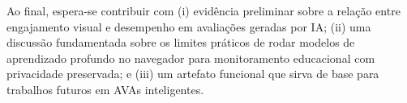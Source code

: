 \documentclass[portuguese,oneside]{tcc}
\begin{document}
Ao final, espera-se contribuir com (i) evidência preliminar sobre a relação entre engajamento visual e desempenho em avaliações geradas por IA; (ii) uma discussão fundamentada sobre os limites práticos de rodar modelos de aprendizado profundo no navegador para monitoramento educacional com privacidade preservada; e (iii) um artefato funcional que sirva de base para trabalhos futuros em AVAs inteligentes.



\end{document}

